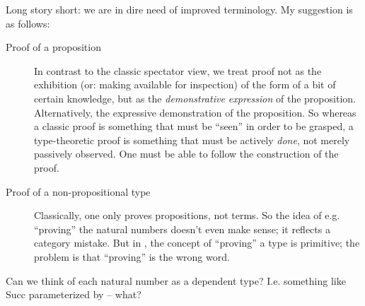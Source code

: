 Long story short: we are in dire need of improved terminology.  My
suggestion is as follows:

\begin{description}
\item [Proof of a proposition] In contrast to the classic spectator
  view, we treat proof not as the exhibition (or: making available for
  inspection) of the form of a bit of certain knowledge, but as the
  \textit{demonstrative expression} of the proposition.  Alternatively, the expressive
  demonstration of the proposition.  So whereas a classic proof is
  something that must be ``seen'' in order to be grasped, a
  type-theoretic proof is something that must be actively
  \textit{done}, not merely passively observed.  One must be able to
  follow the construction of the proof.


\item [Proof of a non-propositional type] Classically, one only proves
  propositions, not terms.  So the idea of e.g. ``proving'' the
  natural numbers doesn't even make sense; it reflects a category
  mistake.  But in \HoTT, the concept of ``proving'' a type is
  primitive; the problem is that ``proving'' is the wrong
  word.
\end{description}

\begin{ednote}
  Can we think of each natural number as a dependent type?
  I.e. something like Succ parameterized by -- what?
\end{ednote}

